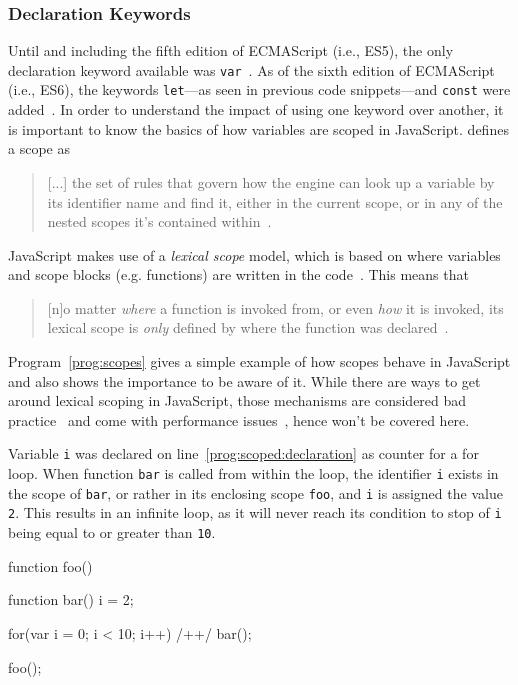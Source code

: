 \label{sec:latest-improvements}

\subsubsection{Declaration Keywords}

Until and including the fifth edition of ECMAScript (i.e., ES5), the only declaration keyword available was \texttt{var}~\cite[p.~87]{ES5Spec:Ecma:2015}. As of the sixth edition of ECMAScript (i.e., ES6), the keywords \texttt{let}---as seen in previous code snippets---and \texttt{const} were added~\cite[p.~194]{ES6Spec:Ecma:2015}. In order to understand the impact of using one keyword over another, it is important to know the basics of how variables are scoped in JavaScript. \citeauthor{YDKJS:ScopesAndClosures:Simpson:2014} defines a scope as 
\begin{quote}
  [...] the set of rules that govern how the engine can look up a variable by its identifier name and find it, either in the current scope, or in any of the nested scopes it’s contained within~\cite[p.~13]{YDKJS:ScopesAndClosures:Simpson:2014}.
\end{quote}
JavaScript makes use of a \emph{lexical scope} model, which is based on where variables and scope blocks (e.g. functions) are written in the code~\cite[p.~13]{YDKJS:ScopesAndClosures:Simpson:2014}. This means that 
\begin{quote}
  [n]o matter \emph{where} a function is invoked from, or even \emph{how} it is invoked, its lexical scope is \emph{only} defined by where the function was declared~\cite[p.~16]{YDKJS:ScopesAndClosures:Simpson:2014}.
\end{quote}
Program~\ref{prog:scopes} gives a simple example of how scopes behave in JavaScript and also shows the importance to be aware of it. While there are ways to get around lexical scoping in JavaScript, those mechanisms are considered bad practice~\cite[p.~14]{YDKJS:ScopesAndClosures:Simpson:2014} and come with performance issues~\cite[p.~21]{YDKJS:ScopesAndClosures:Simpson:2014}, hence won't be covered here.

\begin{program}
\caption{Variable \texttt{i} was declared on line~\ref{prog:scoped:declaration} as counter for a for loop. When function \texttt{bar} is called from within the loop, the identifier \texttt{i} exists in the scope of \texttt{bar}, or rather in its enclosing scope \texttt{foo}, and \texttt{i} is assigned the value \texttt{2}. This results in an infinite loop, as it will never reach its condition to stop of \texttt{i} being equal to or greater than \texttt{10}.~\cite[p.~26]{YDKJS:ScopesAndClosures:Simpson:2014}}
\label{prog:scopes}
\begin{JsCode}
function foo() {

  function bar() {
    i = 2;
  }
  
  for(var i = 0; i < 10; i++) { /+\label{prog:scoped:declaration}+/
    bar();
  }
  
}

foo();
\end{JsCode}
\end{program}

